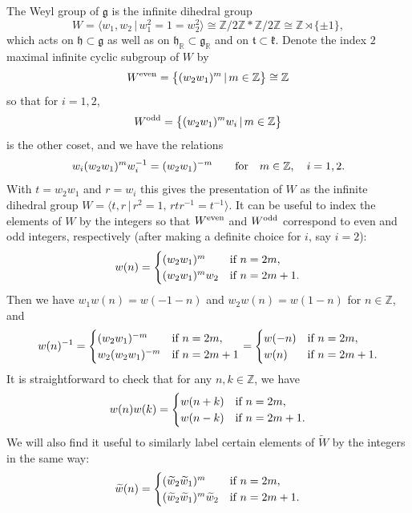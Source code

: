 \documentclass[pdftex]{sigma}
\numberwithin{equation}{section}
\def\R{\mathbb{R}}
\def\Z{\mathbb{Z}}
\def\wtil{\widetilde w}
\def\Wtil{\widetilde W}
\def\fg{\mathfrak{g}}
\def\fh{\mathfrak{h}}
\def\k{\mathfrak{k}}
\def\ft{\mathfrak{t}}
\begin{document}
The Weyl group of $\fg$ is the infinite dihedral group
\[W=\big\langle w_1,w_2\,|\, w_1^2=1=w_2^2\big\rangle\cong {\Z}/2{\Z} \ast{\Z}/2{\Z} \cong{\Z}\rtimes \{\pm 1\}, \]
which acts on $\fh\subset\fg$ as well as on $\fh_\R\subset\fg_\R$ and on $\ft\subset \k$.
Denote the index $2$ maximal infinite cyclic subgroup of $W$ by
\[W^{\rm even} = \big\{(w_2 w_1)^m\, |\, m\in\Z\big\}\cong \Z\]
so that for $i = 1,2$,
\[W^{\rm odd} = \big\{(w_2 w_1)^m w_i\, |\, m\in\Z\big\}\]
is the other coset, and we have the relations
\[w_i (w_2 w_1)^m w_i^{-1} = (w_2 w_1)^{-m}\qquad\hbox{for} \quad m\in\Z, \quad i = 1,2.\]
With $t = w_2 w_1$ and $r = w_i$ this gives the presentation of $W$ as the infinite dihedral group
$W = \big\langle t, r\, |\, r^2 = 1, \, rtr^{-1} = t^{-1}\big\rangle$. It can be useful to index the elements of $W$ by the integers so that
$W^{\rm even}$ and $W^{\rm odd}$ correspond to even and odd integers, respectively (after making a definite choice for $i$, say $i=2$):
\[w(n) = \begin{cases} (w_2 w_1)^m& \hbox{if }n = 2m,\\ (w_2 w_1)^m w_2& \hbox{if }n = 2m+1.\end{cases}\]
Then we have $w_1 w(n) = w(-1-n)$ and $w_2 w(n) = w(1-n)$ for $n\in\Z$, and
\[w(n)^{-1} = \begin{cases} (w_2 w_1)^{-m}& \hbox{if }n = 2m,\\ w_2 (w_2 w_1)^{-m}& \hbox{if }n = 2m+1\end{cases}
= \begin{cases} w(-n)& \hbox{if }n = 2m,\\ w(n)& \hbox{if }n = 2m+1.\end{cases}\]
It is straightforward to check that for any $n,k\in\Z$, we have
\[w(n)w(k) = \begin{cases} w(n+k)& \hbox{if }n = 2m,\\ w(n-k)& \hbox{if }n = 2m+1.\end{cases}\]
We will also find it useful to similarly label certain elements of
$\Wtil$ by the integers in the same way:
\[\wtil(n) = \begin{cases} (\wtil_2 \wtil_1)^m& \hbox{if }n = 2m,\\ (\wtil_2 \wtil_1)^m \wtil_2& \hbox{if }n = 2m+1.\end{cases}\]
\end{document}
